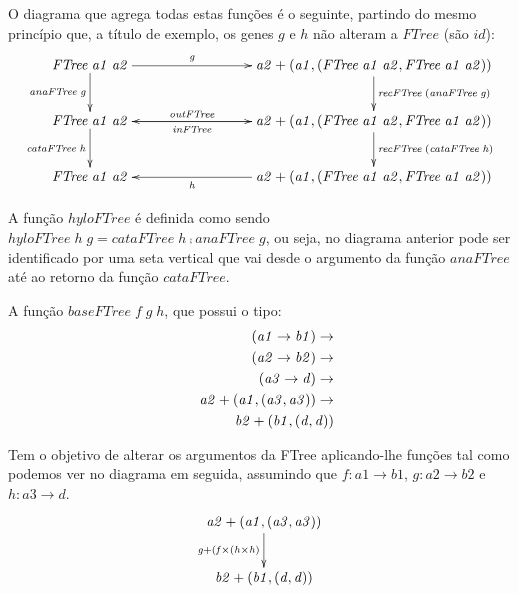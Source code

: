 \documentclass[a4paper]{article}
\newcommand{\Conid}[1]{\mathit{#1}}
\newcommand{\Varid}[1]{\mathit{#1}}
\begin{document}
O diagrama que agrega todas estas funções é o seguinte, partindo do mesmo princípio
que, a título de exemplo, os genes \ensuremath{\Varid{g}} e \ensuremath{\Varid{h}} não alteram a \ensuremath{\Conid{FTree}} (são \ensuremath{\Varid{id}}):
\begin{eqnarray*}
\xymatrix@C=3cm{
   \ensuremath{\Conid{FTree}\;\Varid{a1}\;\Varid{a2}}
          \ar[d]_-{\ensuremath{\Varid{anaFTree}\;\Varid{g}}}
           \ar[r]^-{\ensuremath{\Varid{g}}}
&
    \ensuremath{\Varid{a2}+(\Varid{a1},(\Conid{FTree}\;\Varid{a1}\;\Varid{a2},\Conid{FTree}\;\Varid{a1}\;\Varid{a2}))}
          \ar[d]^{\ensuremath{\Varid{recFTree}\;(\Varid{anaFTree}\;\Varid{g})}}
\\
    \ensuremath{\Conid{FTree}\;\Varid{a1}\;\Varid{a2}}
       \ar[d]_-{\ensuremath{\Varid{cataFTree}\;\Varid{h}}}
       \ar[r]^-{\ensuremath{\Varid{outFTree}}}
&
    \ensuremath{\Varid{a2}+(\Varid{a1},(\Conid{FTree}\;\Varid{a1}\;\Varid{a2},\Conid{FTree}\;\Varid{a1}\;\Varid{a2}))}
          \ar[l]^-{\ensuremath{\Varid{inFTree}}}
           \ar[d]^{\ensuremath{\Varid{recFTree}\;(\Varid{cataFTree}\;\Varid{h})}}
\\
   \ensuremath{\Conid{FTree}\;\Varid{a1}\;\Varid{a2}}
&
   \ensuremath{\Varid{a2}+(\Varid{a1},(\Conid{FTree}\;\Varid{a1}\;\Varid{a2},\Conid{FTree}\;\Varid{a1}\;\Varid{a2}))}
       \ar[l]^-{\ensuremath{\Varid{h}}}
}
\end{eqnarray*}

A função \ensuremath{\Varid{hyloFTree}} é definida como sendo \ensuremath{\Varid{hyloFTree}\;\Varid{h}\;\Varid{g}\mathrel{=}\Varid{cataFTree}\;\Varid{h}\comp \Varid{anaFTree}\;\Varid{g}},
ou seja, no diagrama anterior pode ser identificado por uma seta vertical que vai desde o
argumento da função \ensuremath{\Varid{anaFTree}} até ao retorno da função \ensuremath{\Varid{cataFTree}}.


A função \ensuremath{\Varid{baseFTree}\;\Varid{f}\;\Varid{g}\;\Varid{h}}, que possui o tipo:
\begin{eqnarray*}
\start
\ensuremath{(\Varid{a1}\to \Varid{b1})\to }
\more
\ensuremath{(\Varid{a2}\to \Varid{b2})\to }
\more
\ensuremath{(\Varid{a3}\to \Varid{d})\to }
\more
\ensuremath{\Varid{a2}+(\Varid{a1},(\Varid{a3},\Varid{a3}))\to }
\more
\ensuremath{\Varid{b2}+(\Varid{b1},(\Varid{d},\Varid{d}))}
\end{eqnarray*}


Tem o objetivo de alterar os argumentos da FTree aplicando-lhe funções
tal como podemos ver no diagrama em seguida,
assumindo que \ensuremath{\Varid{f}\mathbin{:}\Varid{a1}\to \Varid{b1}}, \ensuremath{\Varid{g}\mathbin{:}\Varid{a2}\to \Varid{b2}} e \ensuremath{\Varid{h}\mathbin{:}\Varid{a3}\to \Varid{d}}.
\begin{eqnarray*}
\xymatrix@C=20cm{
    \ensuremath{\Varid{a2}+(\Varid{a1},(\Varid{a3},\Varid{a3}))}
           \ar[d]_-{\ensuremath{\Varid{g}\mathbin{+}(\Varid{f}\times(\Varid{h}\times\Varid{h})}}
\\
    \ensuremath{\Varid{b2}+(\Varid{b1},(\Varid{d},\Varid{d}))}
}
\end{eqnarray*}
\end{document}
